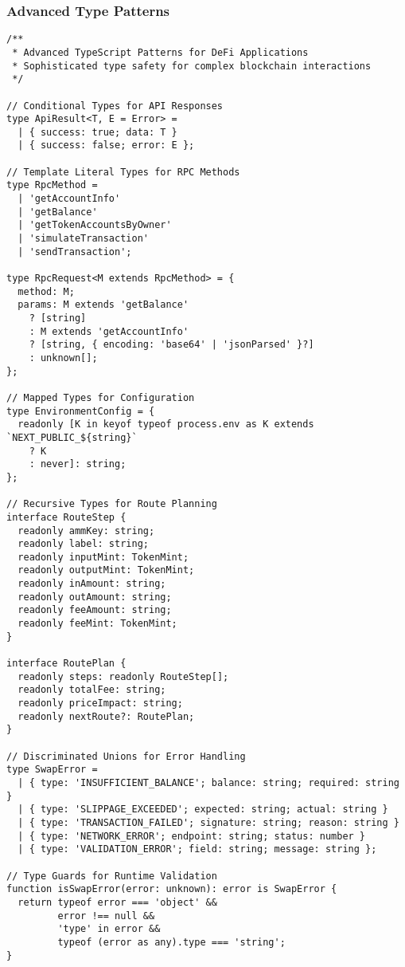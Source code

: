 \documentclass[11pt,a4paper]{article}
\begin{document}
\subsubsection{Advanced Type Patterns}

\begin{lstlisting}[style=typescript, caption=Advanced TypeScript Patterns]
/**
 * Advanced TypeScript Patterns for DeFi Applications
 * Sophisticated type safety for complex blockchain interactions
 */

// Conditional Types for API Responses
type ApiResult<T, E = Error> = 
  | { success: true; data: T }
  | { success: false; error: E };

// Template Literal Types for RPC Methods
type RpcMethod = 
  | 'getAccountInfo'
  | 'getBalance'
  | 'getTokenAccountsByOwner'
  | 'simulateTransaction'
  | 'sendTransaction';

type RpcRequest<M extends RpcMethod> = {
  method: M;
  params: M extends 'getBalance' 
    ? [string] 
    : M extends 'getAccountInfo'
    ? [string, { encoding: 'base64' | 'jsonParsed' }?]
    : unknown[];
};

// Mapped Types for Configuration
type EnvironmentConfig = {
  readonly [K in keyof typeof process.env as K extends `NEXT_PUBLIC_${string}` 
    ? K 
    : never]: string;
};

// Recursive Types for Route Planning
interface RouteStep {
  readonly ammKey: string;
  readonly label: string;
  readonly inputMint: TokenMint;
  readonly outputMint: TokenMint;
  readonly inAmount: string;
  readonly outAmount: string;
  readonly feeAmount: string;
  readonly feeMint: TokenMint;
}

interface RoutePlan {
  readonly steps: readonly RouteStep[];
  readonly totalFee: string;
  readonly priceImpact: string;
  readonly nextRoute?: RoutePlan;
}

// Discriminated Unions for Error Handling
type SwapError = 
  | { type: 'INSUFFICIENT_BALANCE'; balance: string; required: string }
  | { type: 'SLIPPAGE_EXCEEDED'; expected: string; actual: string }
  | { type: 'TRANSACTION_FAILED'; signature: string; reason: string }
  | { type: 'NETWORK_ERROR'; endpoint: string; status: number }
  | { type: 'VALIDATION_ERROR'; field: string; message: string };

// Type Guards for Runtime Validation
function isSwapError(error: unknown): error is SwapError {
  return typeof error === 'object' && 
         error !== null && 
         'type' in error &&
         typeof (error as any).type === 'string';
}


\end{lstlisting}
\end{document}
